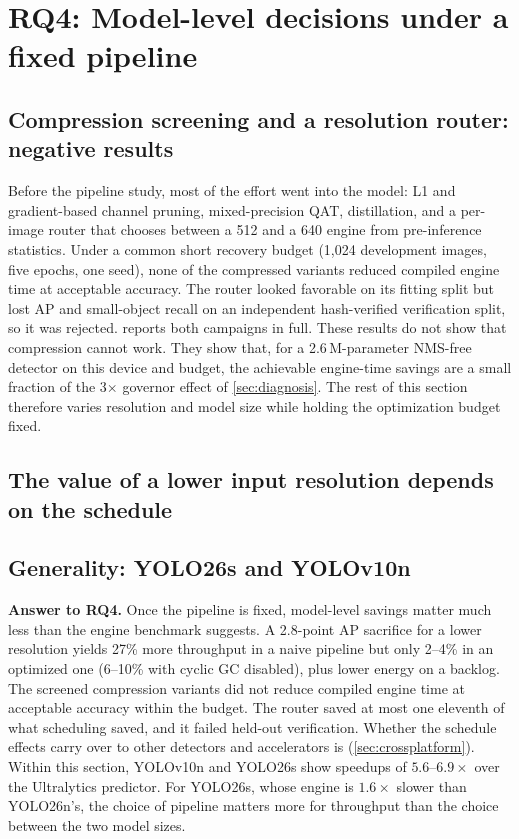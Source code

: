 \section{RQ4: Model-level decisions under a fixed pipeline}
\label{sec:model}

\subsection{Compression screening and a resolution router: negative results}
\label{sec:compression}

Before the pipeline study, most of the effort went into the model:
L1 and gradient-based channel pruning, mixed-precision QAT,
distillation, and a per-image router that chooses between a 512 and a
640 engine from pre-inference statistics. Under a common short
recovery budget (1,024 development images, five epochs, one seed),
none of the compressed variants reduced compiled engine time at
acceptable accuracy. The router looked favorable on its fitting split
but lost AP and small-object recall on an independent hash-verified
verification split, so it was rejected.  reports
both campaigns in full. These results do not show that compression
cannot work. They show that, for a 2.6\,M-parameter NMS-free detector
on this device and budget, the achievable engine-time savings are a
small fraction of the 3$\times$ governor effect of
\cref{sec:diagnosis}. The rest of this section therefore varies
resolution and model size while holding the optimization budget fixed.

\subsection{The value of a lower input resolution depends on the schedule}
\label{sec:resolution}



\subsection{Generality: YOLO26s and YOLOv10n}
\label{sec:generality}



\textbf{Answer to RQ4.}
Once the pipeline is fixed, model-level savings matter much less than
the engine benchmark suggests. A 2.8-point AP sacrifice for a lower
resolution yields 27\% more throughput in a naive pipeline but only
2--4\% in an optimized one (6--10\% with cyclic GC disabled), plus lower
energy on a backlog. The screened compression variants did not reduce
compiled engine time at acceptable accuracy within the budget. The
router saved at most one eleventh of what scheduling saved, and it
failed held-out verification. Whether the schedule effects carry over
to other detectors and accelerators is  (\cref{sec:crossplatform}).
Within this section, YOLOv10n and YOLO26s show speedups of
$5.6$--$6.9\times$ over the Ultralytics predictor. For YOLO26s, whose
engine is $1.6\times$ slower than YOLO26n's, the choice of pipeline
matters more for throughput than the choice between the two model sizes.
